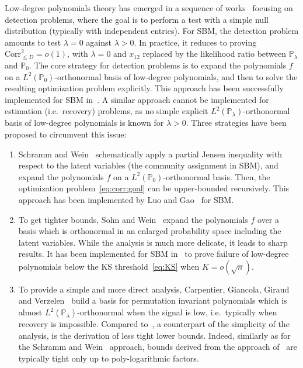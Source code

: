 \documentclass[final]{colt2026}
\newcommand{\1}{\mathbf{1}}
\newcommand{\bbP}{\mathbb{P}}
\newcommand{\pa}[1]{\left(#1\right)}
\begin{document}
Low-degree polynomials theory has emerged in a sequence of works~\cite{HopkinsFOCS17,Hopkins17,hopkins2018statistical,KuniskyWeinBandeira} focusing on detection problems, where the goal is to perform a test with a simple null distribution (typically with independent entries). For SBM, the detection problem amounts to test $\lambda=0$ against  $\lambda>0$.  In practice, it reduces to proving $ \mathrm{Corr}_{\leq D}^2=o(1)$, with $\lambda=0$ and $x_{12}$ replaced by the likelihood ratio between $\bbP_{\lambda}$ and $\bbP_{0}$.  
The core strategy for detection problems is to expand the polynomials $f$ on a $L^2\pa{\bbP_{0}}$-orthonormal basis of low-degree polynomials, and then to solve the resulting optimization problem explicitly. This approach has been successfully implemented for SBM in~\cite{Hopkins17}. A similar approach cannot be implemented for estimation (i.e.\ recovery) problems, as no simple explicit $L^2\pa{\bbP_{\lambda}}$-orthonormal basis of low-degree polynomials is known for $\lambda>0$. Three strategies have been proposed to circumvent this issue:
\begin{enumerate}[wide, labelindent=0pt]\setlength{\itemsep}{0pt}
\item Schramm and Wein~\cite{SchrammWein22} schematically apply a partial Jensen inequality with respect to the latent variables (the community assignment in SBM), and expand the polynomials $f$ on a $L^2\pa{\bbP_{0}}$-orthonormal basis. Then, the optimization problem~\eqref{eq:corr:goal} can be upper-bounded recursively. This approach has been implemented by Luo and Gao~\cite{luo2023computational} for SBM.
\item To get tighter bounds, Sohn and Wein~\cite{SohnWein25} expand the polynomials $f$ over a basis which is orthonormal in an enlarged probability space including the latent variables. While the analysis is much more delicate, it leads to sharp results. It has been implemented for SBM in~\cite{SohnWein25,pmlr-v291-chin25a} to prove failure of low-degree polynomials below the KS threshold~\eqref{eq:KS} when $K=o(\sqrt{n})$. 
\item To provide a simple and more direct analysis, Carpentier, Giancola, Giraud and Verzelen~\cite{CGGV25} build a basis for permutation invariant polynomials which is almost $L^2\pa{\bbP_{\lambda}}$-orthonormal when the signal is low, i.e.\ typically when recovery is impossible. Compared to~\cite{SohnWein25}, a counterpart of the simplicity of the analysis, is the derivation of less tight lower bounds. Indeed, similarly as for the Schramm and Wein~\cite{SchrammWein22} approach, bounds derived from the approach of~\cite{CGGV25}  are typically tight only up to poly-logarithmic factors.
\end{enumerate}
\end{document}
